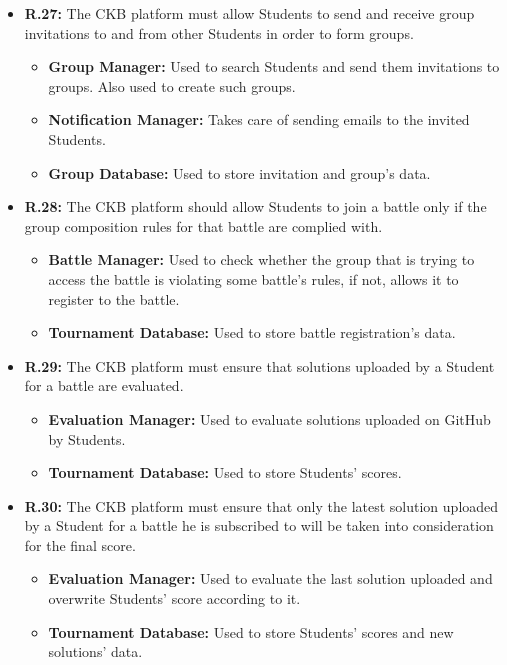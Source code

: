 \documentclass{article}
\begin{document}
{\begin{itemize}
    \item \textbf{R.27:} The CKB platform must allow Students to send and receive group invitations to and from
          other Students in order to form groups.
          \begin{itemize}
              \item \textbf{Group Manager:} Used to search Students and send them invitations to groups.
              Also used to create such groups.
              \item \textbf{Notification Manager:} Takes care of sending emails to the invited Students.
              \item \textbf{Group Database:} Used to store invitation and group's data.
          \end{itemize}
    \item \textbf{R.28:} The CKB platform should allow Students to join a battle only if the group composition rules
          for that battle are complied with.
          \begin{itemize}
              \item \textbf{Battle Manager:} Used to check whether the group that is trying to
              access the battle is violating some battle's rules, if not, allows it to register to
              the battle.
              \item \textbf{Tournament Database:} Used to store battle registration's data.
          \end{itemize}
    \item \textbf{R.29:} The CKB platform must ensure that solutions uploaded by a Student for a battle are evaluated.
          \begin{itemize}
              \item \textbf{Evaluation Manager:} Used to evaluate solutions uploaded on GitHub by Students.
              \item \textbf{Tournament Database:} Used to store Students' scores.
          \end{itemize}
    \item \textbf{R.30:} The CKB platform must ensure that only the latest solution uploaded by a Student for a battle he is subscribed to will
          be taken into consideration for the final score.
          \begin{itemize}
              \item \textbf{Evaluation Manager:} Used to evaluate the last solution uploaded and
              overwrite Students' score according to it.
              \item \textbf{Tournament Database:} Used to store Students' scores and new solutions' data.

\end{itemize}
\end{itemize}}
\end{document}
